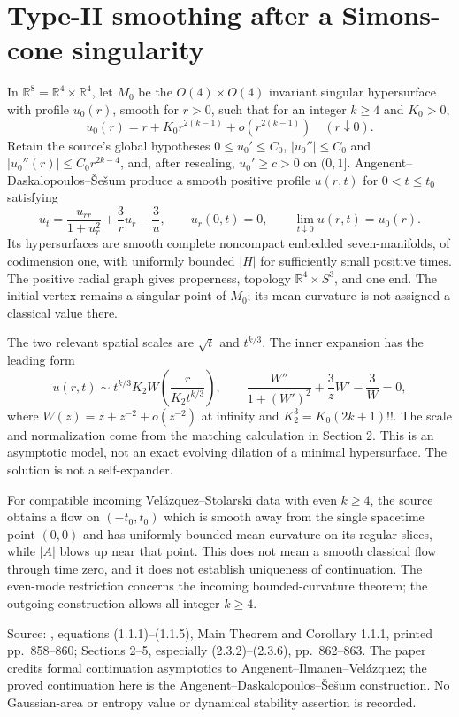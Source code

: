 \chapter{Type-II smoothing after a Simons-cone singularity}\label{sec:catalogue-simons-cone-smoothing}
\begin{example}\label{ex:catalogue-simons-cone-smoothing}
In $\mathbb R^8=\mathbb R^4\times\mathbb R^4$, let $M_0$ be the $O(4)\times O(4)$ invariant singular hypersurface with profile $u_0(r)$, smooth for $r>0$, such that for an integer $k\geq4$ and $K_0>0$,
\[
 u_0(r)=r+K_0r^{2(k-1)}+o(r^{2(k-1)})\quad(r\downarrow0).
\]
Retain the source's global hypotheses $0\leq u_0'\leq C_0$, $|u_0''|\leq C_0$ and $|u_0''(r)|\leq C_0r^{2k-4}$, and, after rescaling, $u_0'\geq c>0$ on $(0,1]$. Angenent--Daskalopoulos--\v Se\v sum produce a smooth positive profile $u(r,t)$ for $0<t\leq t_0$ satisfying
\[
 u_t=\frac{u_{rr}}{1+u_r^2}+\frac3r u_r-\frac3u,
 \qquad u_r(0,t)=0,\qquad \lim_{t\downarrow0}u(r,t)=u_0(r).
\]
Its hypersurfaces are smooth complete noncompact embedded seven-manifolds, of codimension one, with uniformly bounded $|H|$ for sufficiently small positive times. The positive radial graph gives properness, topology $\mathbb R^4\times S^3$, and one end. The initial vertex remains a singular point of $M_0$; its mean curvature is not assigned a classical value there.

The two relevant spatial scales are $\sqrt t$ and $t^{k/3}$. The inner expansion has the leading form
\[
 u(r,t)\sim t^{k/3}K_2W\left(\frac{r}{K_2t^{k/3}}\right),\qquad
 \frac{W''}{1+(W')^2}+\frac3zW'-\frac3W=0,
\]
where $W(z)=z+z^{-2}+o(z^{-2})$ at infinity and $K_2^3=K_0(2k+1)!!$. The scale and normalization come from the matching calculation in Section 2. This is an asymptotic model, not an exact evolving dilation of a minimal hypersurface. The solution is not a self-expander.

For compatible incoming Vel\'azquez--Stolarski data with even $k\geq4$, the source obtains a flow on $(-t_0,t_0)$ which is smooth away from the single spacetime point $(0,0)$ and has uniformly bounded mean curvature on its regular slices, while $|A|$ blows up near that point. This does not mean a smooth classical flow through time zero, and it does not establish uniqueness of continuation. The even-mode restriction concerns the incoming bounded-curvature theorem; the outgoing construction allows all integer $k\geq4$.

Source: \cite{CatADS2026}, equations (1.1.1)--(1.1.5), Main Theorem and Corollary 1.1.1, printed pp.~858--860; Sections 2--5, especially (2.3.2)--(2.3.6), pp.~862--863. The paper credits formal continuation asymptotics to Angenent--Ilmanen--Vel\'azquez; the proved continuation here is the Angenent--Daskalopoulos--\v Se\v sum construction. No Gaussian-area or entropy value or dynamical stability assertion is recorded.


\end{example}
